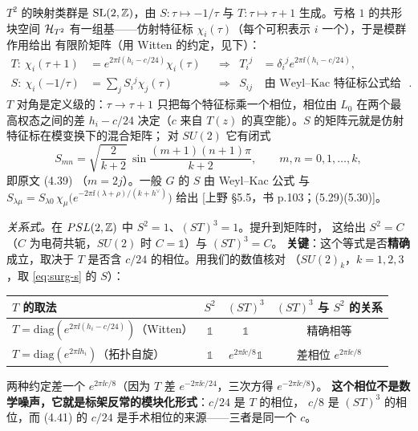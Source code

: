 \begin{derivation}[D8.3：$S$ 与 $T$ 的来源]
$T^2$ 的映射类群是 $\mathrm{SL}(2,\mathbb{Z})$，由
$S:\tau\mapsto-1/\tau$ 与 $T:\tau\mapsto\tau+1$ 生成。亏格 $1$ 的共形块空间
$\mathcal{H}_{T^2}$ 有一组基——仿射特征标 $\chi_i(\tau)$（每个可积表示 $i$ 一个），于是模群作用给出
有限阶矩阵（用 Witten 的约定，见下）：
\begin{align}
T:\ \chi_i(\tau+1)&=e^{2\pi\ii(h_i-c/24)}\chi_i(\tau)
&&\Longrightarrow&
T_i{}^j&=\delta_i{}^j e^{2\pi\ii(h_i-c/24)},\\
S:\ \chi_i(-1/\tau)&=\sum_jS_i{}^j\chi_j(\tau)
&&\Longrightarrow&
S_{ij}&\ \text{由 Weyl--Kac 特征标公式给出}.
\end{align}
$T$ 对角是定义级的：$\tau\to\tau+1$ 只把每个特征标乘一个相位，相位由 $L_0$ 在两个最高权态之间的差
$h_i-c/24$ 决定（$c$ 来自 $T(z)$ 的真空能）。$S$ 的矩阵元就是仿射特征标在模变换下的混合矩阵；
对 $SU(2)$ 它有闭式
\begin{equation}
S_{mn}=\sqrt{\frac{2}{k+2}}\,\sin\frac{(m+1)(n+1)\pi}{k+2},
\qquad m,n=0,1,\dots,k,
\label{eq:surg-s}
\end{equation}
即原文 (4.39) （$m=2j$）。一般 $G$ 的 $S$ 由 Weyl--Kac 公式
与 $S_{\lambda\mu}=S_{\lambda 0}\,\chi_\mu\!\big(e^{-2\pi\ii(\lambda+\rho)/(k+h^\vee)}\big)$ 给出
[上野 \S5.5，书 p.103；(5.29)(5.30)]。

\emph{关系式。}在 $PSL(2,\mathbb{Z})$ 中 $S^2=1$、$(ST)^3=1$。提升到矩阵时，
这给出 $S^2=C$（$C$ 为电荷共轭，$SU(2)$ 时 $C=\mathbb 1$）与 $(ST)^3=C$。
\textbf{关键}：这个等式是否\textbf{精确}成立，取决于 $T$ 是否含 $c/24$ 的相位。用我们的数值核对
（$SU(2)_k$，$k=1,2,3$，取 \eqref{eq:surg-s} 的 $S$）：
\begin{center}
\small
\begin{tabular}{@{}lccc@{}}
\toprule
$T$ 的取法 & $S^2$ & $(ST)^3$ & $(ST)^3$ 与 $S^2$ 的关系 \\
\midrule
$T=\mathrm{diag}(e^{2\pi\ii(h_i-c/24)})$（Witten） & $\mathbb 1$ & $\mathbb 1$ & 精确相等 \\
$T=\mathrm{diag}(e^{2\pi\ii h_i})$（拓扑自旋） & $\mathbb 1$ & $e^{2\pi\ii c/8}\mathbb 1$ & 差相位 $e^{2\pi\ii c/8}$ \\
\bottomrule
\end{tabular}
\end{center}
两种约定差一个 $e^{2\pi\ii c/8}$（因为 $T$ 差 $e^{-2\pi\ii c/24}$，三次方得 $e^{-2\pi\ii c/8}$）。
\textbf{这个相位不是数学噪声，它就是标架反常的模块化形式}：$c/24$ 是 $T$ 的相位，
$c/8$ 是 $(ST)^3$ 的相位，而 (4.41) 的 $c/24$ 是手术相位的来源——三者是同一个 $c$。\ours
\end{derivation}

